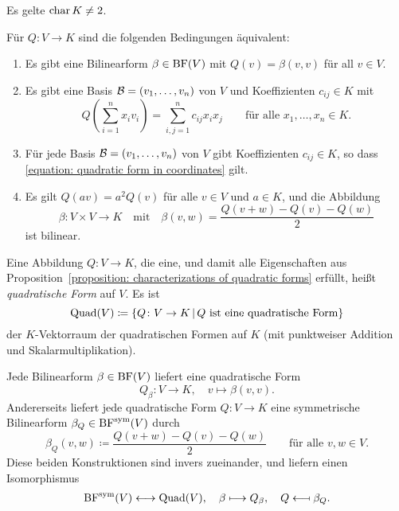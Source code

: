 Es gelte $\operatorname{char} K \neq 2$.

\begin{proposition}
  \label{proposition: characterizations of quadratic forms}
  Für $Q \colon V \to K$ sind die folgenden Bedingungen äquivalent:
  \begin{enumerate}
    \item
      Es gibt eine Bilinearform $\beta \in \operatorname{BF}(V)$ mit $Q(v) = \beta(v, v)$ für all $v \in V$.
    \item
      Es gibt eine Basis $\mathcal{B} = (v_1, \dotsc, v_n)$ von $V$ und Koeffizienten $c_{ij} \in K$ mit
      \begin{equation}
        \label{equation: quadratic form in coordinates}
          Q\left( \sum_{i=1}^n x_i v_i \right)
        = \sum_{i,j=1}^n c_{ij} x_i x_j
        \qquad
        \text{für alle $x_1, \dotsc, x_n \in K$}.
      \end{equation}
    \item
      Für jede Basis $\mathcal{B} = (v_1, \dotsc, v_n)$ von $V$ gibt Koeffizienten $c_{ij} \in K$, so dass \eqref{equation: quadratic form in coordinates} gilt.
    \item
      Es gilt $Q(av) = a^2 Q(v)$ für alle $v \in V$ und $a \in K$, und die Abbildung
      \[
                \beta
        \colon  V \times V
        \to     K
        \quad\text{mit}\quad
          \beta(v,w)
        = \frac{ Q(v + w) - Q(v) - Q(w) }{2}
      \]
      ist bilinear.
  \end{enumerate}
\end{proposition}

\begin{definition}
  Eine Abbildung $Q \colon V \to K$, die eine, und damit alle Eigenschaften aus Proposition~\ref{proposition: characterizations of quadratic forms} erfüllt, heißt \emph{quadratische Form} auf $V$.
  Es ist
  \[
              \operatorname{Quad}(V)
    \coloneqq \{ Q \colon V \to K \,|\, \text{$Q$ ist eine quadratische Form} \}
  \]
  der $K$-Vektorraum der quadratischen Formen auf $K$ \textup(mit punktweiser Addition und Skalarmultiplikation\textup).
\end{definition}

Jede Bilinearform $\beta \in \operatorname{BF}(V)$ liefert eine quadratische Form
\[
          Q_\beta
  \colon  V
  \to     K,
  \quad   v
  \mapsto \beta(v,v).
\]
Andererseits liefert jede quadratische Form $Q \colon V \to K$ eine symmetrische Bilinearform $\beta_Q \in \operatorname{BF}^{\operatorname{sym}}(V)$ durch
\begin{equation}
  \label{equation: polarisation formula}
            \beta_Q(v,w)
  \coloneqq \frac{Q(v+w) - Q(v) - Q(w)}{2}
  \qquad
  \text{für alle $v, w \in V$}.
\end{equation}
Diese beiden Konstruktionen sind invers zueinander, und liefern einen Isomorphismus
\begin{align*}
                      \operatorname{BF}^{\operatorname{sym}}(V)
  \longleftrightarrow \operatorname{Quad}(V),
  \quad
                      \beta
  \longmapsto         Q_\beta,
  \quad
                      Q
  \longmapsfrom       \beta_Q.
\end{align*}


